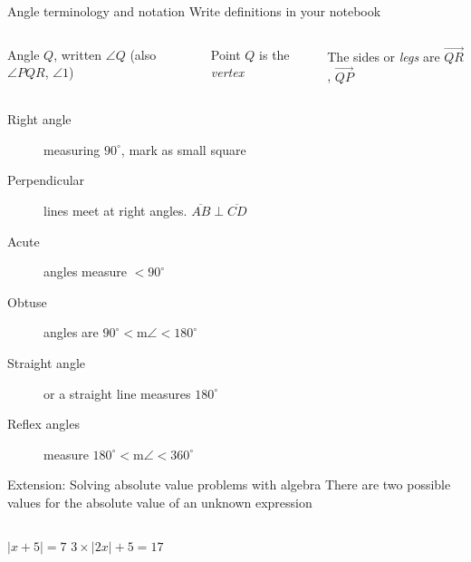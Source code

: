 \begin{frame}{Angle terminology and notation}
  {Write definitions in your notebook}
  \begin{columns}
    Angle $Q$, written $\angle Q$ (also $\angle PQR$, $\angle 1$) \par \medskip
    Point $Q$ is the \emph{vertex} \par \medskip
    The sides or \emph{legs} are $\overrightarrow{QR}$, $\overrightarrow{QP}$  \par \medskip
  \end{columns} \bigskip
  \begin{description}
    \item[Right angle] measuring $90^\circ$, mark as small square
    \item[Perpendicular] lines meet at right angles. $\overline{AB} \perp \overline{CD}$
    \item[Acute] angles measure $< 90^\circ$
    \item[Obtuse] angles are $90^\circ < \text{m}\angle < 180^\circ$
    \item[Straight angle] or a straight line  measures $180^\circ$
    \item[Reflex angles] measure $180^\circ < \text{m}\angle < 360^\circ$
  \end{description}
  \end{frame}

\begin{frame}{Extension: Solving absolute value problems with algebra}
  {There are two possible values for the absolute value of an unknown expression}
  \begin{columns}
      $|x+5|=7$
    $3 \times |2x|+5=17$
  \end{columns}
  \vspace{5cm}
  \end{frame}

